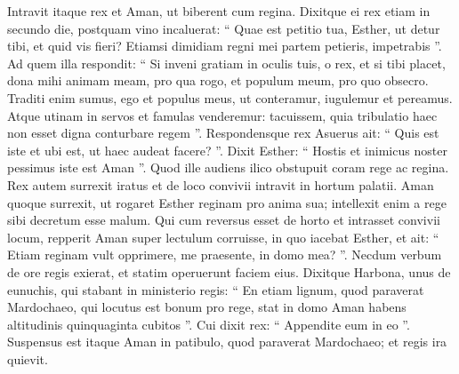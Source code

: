 \begin{biblechapter}
\begin{biblechapter}
\begin{biblechapter}
\begin{biblechapter}
\begin{biblechapter}
\begin{biblechapter}
\begin{biblechapter}
\verse Intravit itaque rex et Aman, ut biberent cum regina. 
\verse Dixitque ei rex etiam in secundo die, postquam vino incaluerat: “ Quae est petitio tua, Esther, ut detur tibi, et quid vis fieri? Etiamsi dimidiam regni mei partem petieris, impetrabis ”. 
\verse Ad quem illa respondit: “ Si inveni gratiam in oculis tuis, o rex, et si tibi placet, dona mihi animam meam, pro qua rogo, et populum meum, pro quo obsecro. 
\verse Traditi enim sumus, ego et populus meus, ut conteramur, iugulemur et pereamus. Atque utinam in servos et famulas venderemur: tacuissem, quia tribulatio haec non esset digna conturbare regem ”. 
\verse Respondensque rex Asuerus ait: “ Quis est iste et ubi est, ut haec audeat facere? ”. 
\verse Dixit Esther: “ Hostis et inimicus noster pessimus iste est Aman ”. Quod ille audiens ilico obstupuit coram rege ac regina.
 \verse Rex autem surrexit iratus et de loco convivii intravit in hortum palatii. Aman quoque surrexit, ut rogaret Esther reginam pro anima sua; intellexit enim a rege sibi decretum esse malum. 
\verse Qui cum reversus esset de horto et intrasset convivii locum, repperit Aman super lectulum corruisse, in quo iacebat Esther, et ait: “ Etiam reginam vult opprimere, me praesente, in domo mea? ”. Necdum verbum de ore regis exierat, et statim operuerunt faciem eius. 
\verse Dixitque Harbona, unus de eunuchis, qui stabant in ministerio regis: “ En etiam lignum, quod paraverat Mardochaeo, qui locutus est bonum pro rege, stat in domo Aman habens altitudinis quinquaginta cubitos ”. Cui dixit rex: “ Appendite eum in eo ”. 
\verse Suspensus est itaque Aman in patibulo, quod paraverat Mardochaeo; et regis ira quievit.
 

\end{biblechapter}
\end{biblechapter}
\end{biblechapter}
\end{biblechapter}
\end{biblechapter}
\end{biblechapter}
\end{biblechapter}
